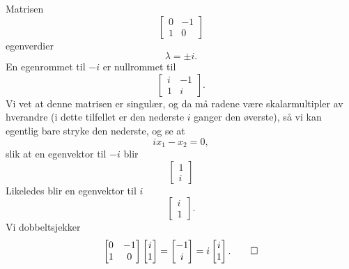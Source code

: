 \begin{ex}
Matrisen
\[
\begin{bmatrix}
0 & -1 \\ 1 &0
\end{bmatrix}
\]
egenverdier
\[
\lambda=\pm i.
\] 
En egenrommet til $-i$ er nullrommet til 
\[
\begin{bmatrix}
i & -1 \\ 1 &i
\end{bmatrix}.
\]
Vi vet at denne matrisen er singulær, 
og da må radene være skalarmultipler av hverandre (i dette tilfellet er den nederste $i$ ganger den øverste), 
så vi kan egentlig bare stryke den nederste, og se at
\[
ix_1-x_2=0,
\]
slik at en egenvektor til $-i$ blir
\[
\begin{bmatrix}
1  \\ i
\end{bmatrix}
\]
Likeledes blir en egenvektor til $i$ 
\[
\begin{bmatrix}
i  \\ 1
\end{bmatrix}.
\]
Vi dobbeltsjekker
\[
\begin{bmatrix}
0 & -1 \\ 1 &0
\end{bmatrix}
\begin{bmatrix}
i  \\ 1
\end{bmatrix}
=
\begin{bmatrix}
-1  \\ i
\end{bmatrix}
=
i
\begin{bmatrix}
i  \\ 1
\end{bmatrix}.\qedhere
\]
\end{ex}

